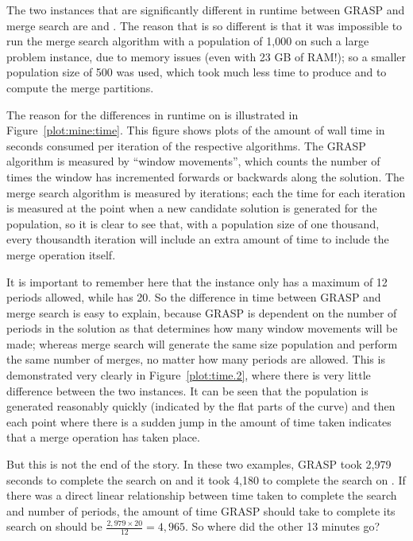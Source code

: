 \documentclass[journal]{IEEEtran}
\begin{document}
The two instances that are significantly different in runtime between GRASP and merge search are \dmine{} and \zucklarge{}. The reason that \zucklarge{} is so different is that it was impossible to run the merge search algorithm with a population of 1,000 on such a large problem instance, due to memory issues (even with 23 GB of RAM!); so a smaller population size of 500 was used, which took much less time to produce and to compute the merge partitions.

The reason for the differences in runtime on \dmine{} is illustrated in Figure~\ref{plot:mine:time}.
This figure shows plots of the amount of wall time in seconds consumed per iteration of the respective algorithms. The GRASP algorithm is measured by ``window movements'', which counts the number of times the window has incremented forwards or backwards along the solution. The merge search algorithm is measured by iterations; each the time for each iteration is measured at the point when a new candidate solution is generated for the population, so it is clear to see that, with a population size of one thousand, every thousandth iteration will include an extra amount of time to include the merge operation itself. 

It is important to remember here that the \dmine{} instance only has a maximum of 12 periods allowed, while \zucksmall{} has 20. So the difference in time between GRASP and merge search is easy to explain, because GRASP is dependent on the number of periods in the solution as that determines how many window movements will be made; whereas merge search will generate the same size population and perform the same number of merges, no matter how many periods are allowed. This is demonstrated very clearly in Figure~\ref{plot:time.2}, where there is very little difference between the two instances. It can be seen that the population is generated reasonably quickly (indicated by the flat parts of the curve) and then each point where there is a sudden jump in the amount of time taken indicates that a merge operation has taken place.

But this is not the end of the story. In these two examples, GRASP took 2,979 seconds to complete the search on \dmine{} and it took 4,180 to complete the search on \zucksmall{}. If there was a direct linear relationship between time taken to complete the search and number of periods, the amount of time GRASP should take to complete its search on \zucksmall{} should be \(\frac{2,979\times20}{12} = 4,965\). So where did the other 13 minutes go?
\end{document}
